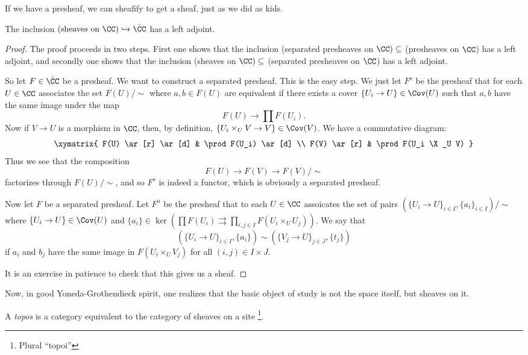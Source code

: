 \documentclass[11pt, english]{article}
\begin{document}
If we have a presheaf, we can sheafify to get a sheaf, just as we did as kids.
\begin{thm}
The inclusion $(\text{sheaves on } \CC) \hookrightarrow \hat \CC$ has a left adjoint.
\end{thm}
\begin{proof}
The proof proceeds in two steps. First one shows that the inclusion (separated presheaves on $\CC) \subseteq$ (presheaves on $\CC$) has a left adjoint, and secondly one shows that the inclusion (sheaves on $\CC) \subseteq$ (separated presheaves on $\CC$) has a left adjoint.

So let $F \in \hat \CC$ be a presheaf. We want to construct a separated presheaf. This is the easy step. We just let $F^s$ be the presheaf that for each $U \in \CC$ associates the set $F(U)/\sim$ where $a,b \in F(U)$ are equivalent if there exists a cover $\{ U_i \to U\} \in \Cov(U)$ such that $a,b$ have the same image under the map
\[
F(U) \to \prod F(U_i).
\]
Now if $V \to U$ is a morphism in $\CC$, then, by definition, $\{ U_i \times_ U V \to V\} \in \Cov(V)$. We have a commutative diagram:
\[
\xymatrix{
F(U) \ar[r] \ar[d] & \prod F(U_i) \ar[d] \\
F(V) \ar[r] & \prod F(U_i \X_U V)
}
\]
Thus we see that the composition
\[
F(U) \to F(V) \to F(V)/\sim
\]
factorizes through $F(U)/\sim$, and so $F^s$ is indeed a functor, which is obviously a separated presheaf.

Now let $F$ be a separated presheaf. Let $F^a$ be the presheaf that to each $U \in \CC$ assoicates the set of pairs $(\{U_i \to U\}_{i \in I} , \{a_i\}_{i \in I})/\sim$ where $\{ U_i \to U\} \in \Cov(U)$ and $\{ a_i \} \in \ker(\prod F(U_i) \rightrightarrows \prod_{i,j \in I} F(U_i \times_U U_j))$. We say that
\[
(\{ U_i \to U\}_{i \in I}, \{a_i\}) \sim (\{ V_j \to U\}_{j \in J}, \{ t_j\} )
\]
if $a_i$ and $b_j$ have the same image in $F(U_i \times_U V_j)$ for all $(i,j) \in I \times J$.


It is an exercise in patience to check that this gives us a sheaf.
\end{proof}

Now, in good Yoneda-Grothendieck spirit, one realizes that the basic object of study is not the space itself, but sheaves on it. 

\begin{defi}[Topoi]
A \emph{topos} is a category equivalent to the category of sheaves on a site \footnote{Plural ``topoi''}.
\end{defi}
\end{document}

